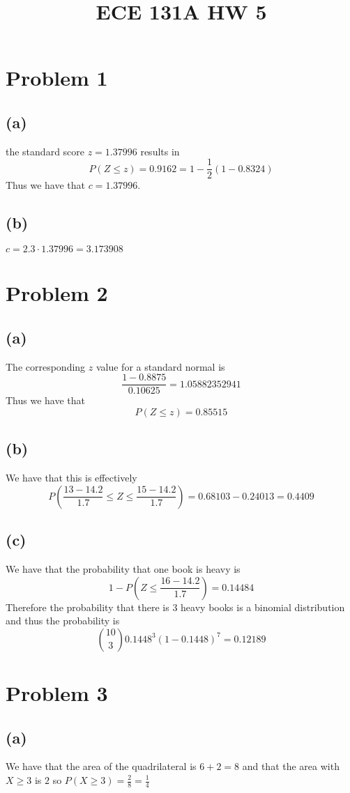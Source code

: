 
\title{ECE 131A HW 5}

\maketitle
\section*{Problem 1}
\subsection*{(a)}
the standard score $z=1.37996$ results in 
$$P(Z\leq z)=0.9162=1-\frac{1}{2}(1-0.8324)$$
Thus we have that $c=\boxed{1.37996}$.
\subsection*{(b)}
$c=2.3\cdot 1.37996=\boxed{3.173908}$
\section*{Problem 2}
\subsection*{(a)}
The corresponding $z$ value for a standard normal is 
$$\frac{1-0.8875}{0.10625}=1.05882352941$$
Thus we have that
$$P(Z\leq z)=0.85515$$
\subsection*{(b)}
We have that this is effectively
$$P\left(\frac{13-14.2}{1.7}\leq Z\leq \frac{15-14.2}{1.7}\right)=0.68103-0.24013=\boxed{0.4409}$$
\subsection*{(c)}
We have that the probability that one book is heavy is 
$$1-P(Z\leq \frac{16-14.2}{1.7})=0.14484$$
Therefore the probability that there is 3 heavy books is a binomial
distribution and thus the probability is 
$${10\choose 3}0.1448^3(1-0.1448)^7=\boxed{0.12189}$$
\section*{Problem 3}
\subsection*{(a)}
We have that the area of the quadrilateral is $6+2=8$ and 
that the area with $X\geq 3$ is $2$ so $P(X\geq 3)=\frac{2}{8}=\boxed{\frac{1}{4}}$
